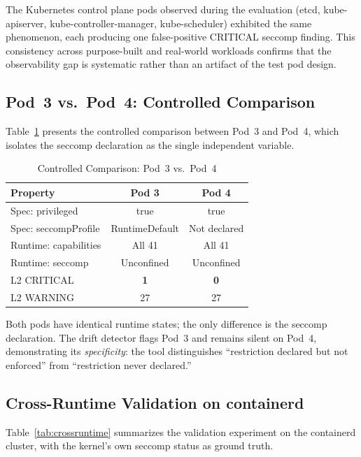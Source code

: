 \documentclass[sigconf]{acmart}
\begin{document}
The Kubernetes control plane pods observed during the evaluation (etcd, kube-apiserver, kube-controller-manager, kube-scheduler) exhibited the same phenomenon, each producing one false-positive CRITICAL seccomp finding. This consistency across purpose-built and real-world workloads confirms that the observability gap is systematic rather than an artifact of the test pod design.

\subsection{Pod~3 vs.\ Pod~4: Controlled Comparison}

Table~\ref{tab:comparison} presents the controlled comparison between Pod~3 and Pod~4, which isolates the seccomp declaration as the single independent variable.

\begin{table}[htbp]
\caption{Controlled Comparison: Pod~3 vs.\ Pod~4}
\label{tab:comparison}
\centering
\begin{tabular}{lcc}
\toprule
\textbf{Property} & \textbf{Pod 3} & \textbf{Pod 4} \\
\midrule
Spec: privileged     & true & true \\
Spec: seccompProfile & RuntimeDefault & Not declared \\
Runtime: capabilities & All 41 & All 41 \\
Runtime: seccomp     & Unconfined & Unconfined \\
L2 CRITICAL          & \textbf{1} & \textbf{0} \\
L2 WARNING           & 27 & 27 \\
\bottomrule
\end{tabular}
\end{table}

Both pods have identical runtime states; the only difference is the seccomp declaration. The drift detector flags Pod~3 and remains silent on Pod~4, demonstrating its \emph{specificity}: the tool distinguishes ``restriction declared but not enforced'' from ``restriction never declared.''

\subsection{Cross-Runtime Validation on containerd}
\label{sec:crossruntime}

Table~\ref{tab:crossruntime} summarizes the validation experiment on the containerd cluster, with the kernel's own seccomp status as ground truth.
\end{document}
